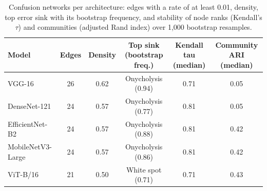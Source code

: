 \begin{table}[!tbp]
\centering
\caption{Confusion networks per architecture: edges with a rate of at least 0.01, density, top error sink with its bootstrap frequency, and stability of node ranks (Kendall's $\tau$) and communities (adjusted Rand index) over 1,000 bootstrap resamples.}
\label{tab:sna}
\footnotesize
\begin{tabular}{lccccc}
\hline
Model & Edges & Density & Top sink (bootstrap freq.) & Kendall tau (median) & Community ARI (median) \\
\hline
VGG-16 & 26 & 0.62 & Onycholysis (0.94) & 0.71 & 0.05 \\
DenseNet-121 & 24 & 0.57 & Onycholysis (0.77) & 0.81 & 0.05 \\
EfficientNet-B2 & 24 & 0.57 & Onycholysis (0.88) & 0.81 & 0.42 \\
MobileNetV3-Large & 24 & 0.57 & Onycholysis (0.86) & 0.81 & 0.42 \\
ViT-B/16 & 21 & 0.50 & White spot (0.71) & 0.71 & 0.43 \\
\hline
\end{tabular}
\end{table}